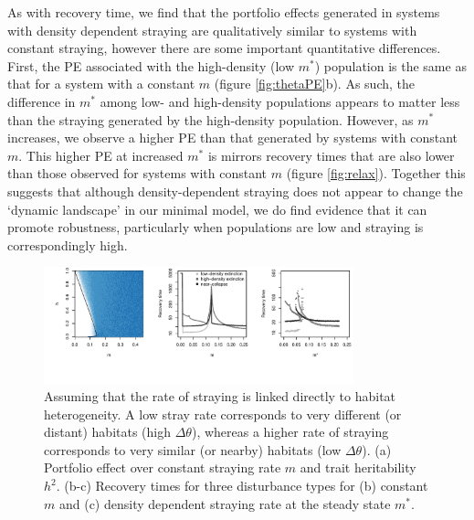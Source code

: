 \documentclass[twocolumn,preprintnumbers,amsmath,amssymb,superscriptaddress]{revtex4}
\begin{document}
As with recovery time, we find that the portfolio effects generated in systems with density dependent straying are qualitatively similar to systems with constant straying, however there are some important quantitative differences.
First, the PE associated with the high-density (low $m^*$) population is the same as that for a system with a constant $m$ (figure \ref{fig:thetaPE}b).
As such, the difference in $m^*$ among low- and high-density populations appears to matter less than the straying generated by the high-density population.
However, as $m^*$ increases, we observe a higher PE than that generated by systems with constant $m$.
This higher PE at increased $m^*$ is mirrors recovery times that are also lower than those observed for systems with constant $m$ (figure \ref{fig:relax}).
Together this suggests that although density-dependent straying does not appear to change the `dynamic landscape' in our minimal model, we do find evidence that it can promote robustness, particularly when populations are low and straying is correspondingly high.
% 
% 
% 
% 
% 
% 
\\

\begin{figure}
  \captionsetup{justification=raggedright,
singlelinecheck=false
}
  \centering
  \includegraphics[width=0.8\textwidth]{figs2/fig_MDPE_hm_mtheta_rt.pdf}
  \caption{
  Assuming that the rate of straying is linked directly to habitat heterogeneity. A low stray rate corresponds to very different (or distant) habitats (high $\Delta\theta$), whereas a higher rate of straying corresponds to very similar (or nearby) habitats (low $\Delta\theta$).
  (a) Portfolio effect over constant straying rate $m$ and trait heritability $h^2$.
  (b-c) Recovery times for three disturbance types for (b) constant $m$ and (c) density dependent straying rate at the steady state $m^*$.
  } \label{fig:mtheta}
\end{figure}
\end{document}
